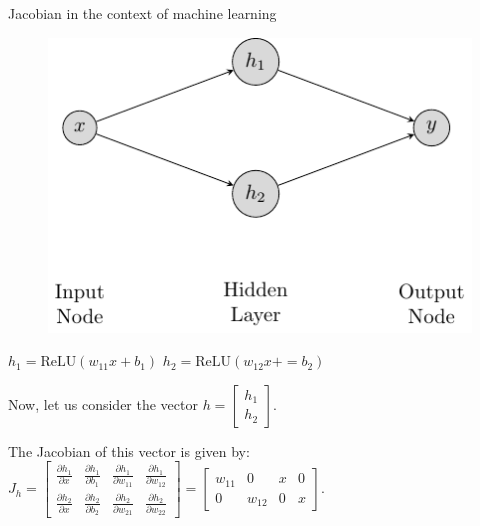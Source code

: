 \documentclass[handout]{beamer}
\begin{document}
\begin{frame}{Jacobian in the context of machine learning}
\begin{figure}
    \includegraphics[scale=0.5]{../diagrams/mlp.pdf}
\end{figure}

$h_1 = \mathrm{ReLU}(w_{11} x + b_1)$
$h_2 = \mathrm{ReLU}(w_{12} x + =b_2)$

Now, let us consider the vector $h = \begin{bmatrix} h_1 \\ h_2 \end{bmatrix}$.

The Jacobian of this vector is given by: $J_h = \begin{bmatrix} \frac{\partial h_1}{\partial x} & \frac{\partial h_1}{\partial b_1} & \frac{\partial h_1}{\partial w_{11}} & \frac{\partial h_1}{\partial w_{12}} \\ \frac{\partial h_2}{\partial x} & \frac{\partial h_2}{\partial b_2} & \frac{\partial h_2}{\partial w_{21}} & \frac{\partial h_2}{\partial w_{22}} \end{bmatrix} = \begin{bmatrix} w_{11} & 0 & x & 0 \\ 0 & w_{12} & 0 & x \end{bmatrix}$.

\end{frame}
\end{document}
